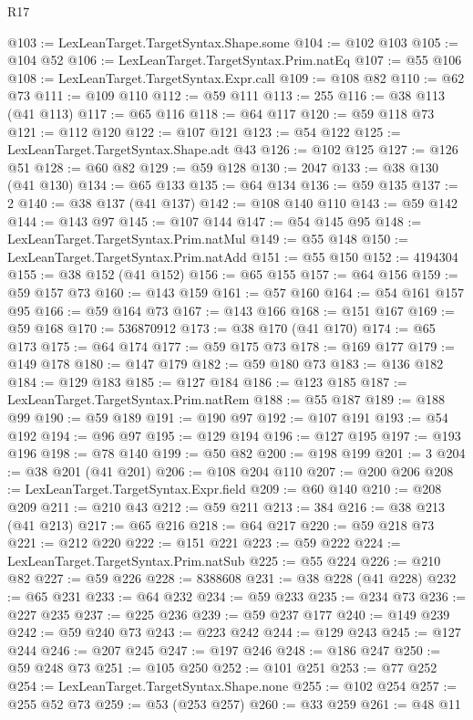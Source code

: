 \begin{lexlean}{R17}
\begin{coremodule}
@103 := LexLeanTarget.TargetSyntax.Shape.some
@104 := @102 @103
@105 := @104 @52
@106 := LexLeanTarget.TargetSyntax.Prim.natEq
@107 := @55 @106
@108 := LexLeanTarget.TargetSyntax.Expr.call
@109 := @108 @82
@110 := @62 @73
@111 := @109 @110
@112 := @59 @111
@113 := 255
@116 := @38 @113 (@41 @113)
@117 := @65 @116
@118 := @64 @117
@120 := @59 @118 @73
@121 := @112 @120
@122 := @107 @121
@123 := @54 @122
@125 := LexLeanTarget.TargetSyntax.Shape.adt @43
@126 := @102 @125
@127 := @126 @51
@128 := @60 @82
@129 := @59 @128
@130 := 2047
@133 := @38 @130 (@41 @130)
@134 := @65 @133
@135 := @64 @134
@136 := @59 @135
@137 := 2
@140 := @38 @137 (@41 @137)
@142 := @108 @140 @110
@143 := @59 @142
@144 := @143 @97
@145 := @107 @144
@147 := @54 @145 @95
@148 := LexLeanTarget.TargetSyntax.Prim.natMul
@149 := @55 @148
@150 := LexLeanTarget.TargetSyntax.Prim.natAdd
@151 := @55 @150
@152 := 4194304
@155 := @38 @152 (@41 @152)
@156 := @65 @155
@157 := @64 @156
@159 := @59 @157 @73
@160 := @143 @159
@161 := @57 @160
@164 := @54 @161 @157 @95
@166 := @59 @164 @73
@167 := @143 @166
@168 := @151 @167
@169 := @59 @168
@170 := 536870912
@173 := @38 @170 (@41 @170)
@174 := @65 @173
@175 := @64 @174
@177 := @59 @175 @73
@178 := @169 @177
@179 := @149 @178
@180 := @147 @179
@182 := @59 @180 @73
@183 := @136 @182
@184 := @129 @183
@185 := @127 @184
@186 := @123 @185
@187 := LexLeanTarget.TargetSyntax.Prim.natRem
@188 := @55 @187
@189 := @188 @99
@190 := @59 @189
@191 := @190 @97
@192 := @107 @191
@193 := @54 @192
@194 := @96 @97
@195 := @129 @194
@196 := @127 @195
@197 := @193 @196
@198 := @78 @140
@199 := @50 @82
@200 := @198 @199
@201 := 3
@204 := @38 @201 (@41 @201)
@206 := @108 @204 @110
@207 := @200 @206
@208 := LexLeanTarget.TargetSyntax.Expr.field
@209 := @60 @140
@210 := @208 @209
@211 := @210 @43
@212 := @59 @211
@213 := 384
@216 := @38 @213 (@41 @213)
@217 := @65 @216
@218 := @64 @217
@220 := @59 @218 @73
@221 := @212 @220
@222 := @151 @221
@223 := @59 @222
@224 := LexLeanTarget.TargetSyntax.Prim.natSub
@225 := @55 @224
@226 := @210 @82
@227 := @59 @226
@228 := 8388608
@231 := @38 @228 (@41 @228)
@232 := @65 @231
@233 := @64 @232
@234 := @59 @233
@235 := @234 @73
@236 := @227 @235
@237 := @225 @236
@239 := @59 @237 @177
@240 := @149 @239
@242 := @59 @240 @73
@243 := @223 @242
@244 := @129 @243
@245 := @127 @244
@246 := @207 @245
@247 := @197 @246
@248 := @186 @247
@250 := @59 @248 @73
@251 := @105 @250
@252 := @101 @251
@253 := @77 @252
@254 := LexLeanTarget.TargetSyntax.Shape.none
@255 := @102 @254
@257 := @255 @52 @73
@259 := @53 (@253 @257)
@260 := @33 @259
@261 := @48 @11

\end{coremodule}
\end{lexlean}
